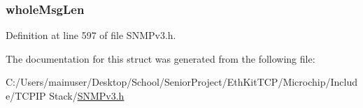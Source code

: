 \subsubsection[{whole\+Msg\+Len}]{ whole\+Msg\+Len}\label{struct_s_n_m_p_v3___r_e_s_p_o_n_s_e___w_h_o_l_e_m_s_g_ae16edc50bd430cdfe533ff1839bdc38c}


Definition at line 597 of file S\+N\+M\+Pv3.\+h.



The documentation for this struct was generated from the following file\+:\begin{DoxyCompactItemize}
\item 
C\+:/\+Users/mainuser/\+Desktop/\+School/\+Senior\+Project/\+Eth\+Kit\+T\+C\+P/\+Microchip/\+Include/\+T\+C\+P\+I\+P Stack/\hyperlink{_s_n_m_pv3_8h}{S\+N\+M\+Pv3.\+h}\end{DoxyCompactItemize}
